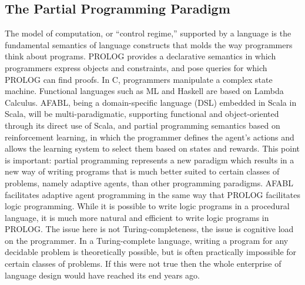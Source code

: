 \subsection{The Partial Programming Paradigm}

The model of computation, or ``control regime,'' supported by a language is the fundamental semantics of language constructs that molds the way programmers think about programs. PROLOG provides a declarative semantics in which programmers express objects and constraints, and pose queries for which PROLOG can find proofs.  In C, programmers manipulate a complex state machine. Functional languages such as ML and Haskell are based on Lambda Calculus. AFABL, being a domain-specific language (DSL) \cite{hudak1996building} embedded in Scala \cite{odersky2008programming,odersky2005scalable} in Scala, will be multi-paradigmatic, supporting functional and object-oriented through its direct use of Scala, and partial programming semantics based on reinforcement learning, in which the programmer defines the agent's actions and allows the learning system to select them based on states and rewards.  This point is important: partial programming represents a new paradigm which results in a new way of writing programs that is much better suited to certain classes of problems, namely adaptive agents, than other programming paradigms.  AFABL facilitates adaptive agent programming in the same way that PROLOG facilitates logic programming.  While it is possible to write logic programs in a procedural language, it is much more natural and efficient to write logic programs in PROLOG.  The issue here is not Turing-completeness, the issue is cognitive load on the programmer.  In a Turing-complete language, writing a program for any decidable problem is theoretically possible, but is often practically impossible for certain classes of problems.  If this were not true then the whole enterprise of language design would have reached its end years ago.


